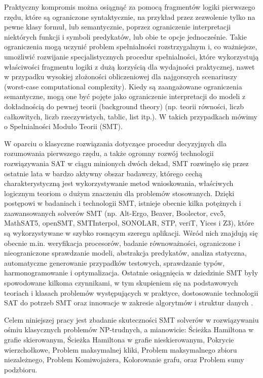 \documentclass[xodstep]{wnspt}
\begin{document}
Praktyczny kompromis można osiągnąć za pomocą fragmentów logiki pierwszego rzędu, które są ograniczone syntaktycznie, na przykład przez zezwolenie tylko na pewne klasy formuł, lub semantycznie, poprzez ograniczenie interpretacji niektórych funkcji i symboli predykatów, lub obie te opcje jednocześnie. Takie ograniczenia mogą uczynić problem spełnialności rozstrzygalnym i, co ważniejsze, umożliwić rozwijanie specjalistycznych procedur spełnialności, które wykorzystują właściwości fragmentu logiki z dużą korzyścią dla wydajności praktycznej, nawet w przypadku wysokiej złożoności obliczeniowej dla najgorszych scenariuszy (worst-case computational complexity). Kiedy są zaangażowane ograniczenia semantyczne, mogą one być pojęte jako ograniczenie interpretacji do modeli z dokładnością do pewnej teorii (background theory) (np. teorii równości, liczb całkowitych, liczb rzeczywistych, tablic, list itp.). W takich przypadkach mówimy o Spełnialności Moduło Teorii (SMT).

W oparciu o klasyczne rozwiązania dotyczące procedur decyzyjnych dla rozumowania pierwszego rzędu, a także ogromny rozwój technologii rozwiązywania SAT w ciągu minionych dwóch dekad,
SMT rozwinęło się przez ostatnie lata w bardzo aktywny obszar badawczy, którego cechą charakterystyczną jest wykorzystywanie metod wnioskowania, właściwych logicznym teoriom o dużym znaczeniu dla problemów stosowanych.
Dzięki postępowi w badaniach i technologii SMT, istnieje obecnie kilka potężnych i zaawansowanych solverów SMT (np. Alt-Ergo, Beaver, Boolector, cvc5, MathSAT5, openSMT, SMTInterpol, SONOLAR, STP, veriT, Yices i Z3), które są wykorzystywane w szybko rosnącym szeregu aplikacji. Wśród nich znajdują się obecnie m.in. weryfikacja procesorów, badanie równoważności, ograniczone i nieograniczone sprawdzanie modeli, abstrakcja predykatów, analiza statyczna, automatyczne generowanie przypadków testowych, sprawdzanie typów, harmonogramowanie i optymalizacja.
Ostatnie osiągnięcia w dziedzinie SMT były spowodowane kilkoma czynnikami, w tym skupieniem się na podstawowych teoriach i klasach problemów występujących w praktyce, dostosowanie technologii SAT do potrzeb SMT oraz innowacje w zakresie algorytmów i struktur danych \cite{Clarke18}.

Celem niniejszej pracy jest zbadanie skuteczności SMT solverów w rozwiązywaniu ośmiu klasycznych problemów NP-trudnych, a mianowicie: Ścieżka Hamiltona w grafie skierowanym, Ścieżka Hamiltona w grafie nieskierowanym, Pokrycie wierzchołkowe, Problem maksymalnej kliki, Problem maksymalnego zbioru niezależnego, Problem Komiwojażera, Kolorowanie grafu, oraz Problem sumy podzbioru.
\end{document}
